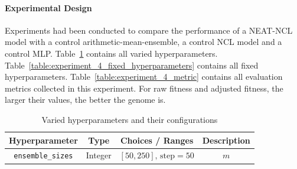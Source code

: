 \paragraph{Experimental Design}
Experiments had been conducted to compare the performance of a NEAT-NCL model with a control arithmetic-mean-ensemble, a control NCL model and a control MLP. Table~\ref{table:experiment_4_varied_hyperparameters} contains all varied hyperparameters. Table~\ref{table:experiment_4_fixed_hyperparameters} contains all fixed hyperparameters. Table~\ref{table:experiment_4_metric} contains all evaluation metrics collected in this experiment. For raw fitness and adjusted fitness, the larger their values, the better the genome is. 

\begin{table}[H]
    \centering
    \begin{tabular}{|c|c|c|c|}
        \hline
        Hyperparameter & Type & Choices / Ranges & Description \\
        \hline
        \small\texttt{ensemble\_sizes} & Integer & $[50, 250]\text{, step}=50$ & $m$ \\
        \hline
    \end{tabular}
    \caption{Varied hyperparameters and their configurations}
    \label{table:experiment_4_varied_hyperparameters}
\end{table}

